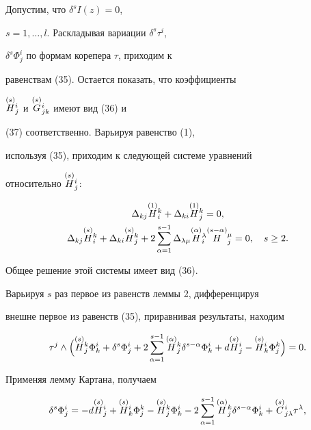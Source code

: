 \begin{pf} Допустим, что $\delta^sI(z)=0$,


$s=1,\dotsc,l$. Раскладывая вариации $\delta^s\tau^i$,


$\delta^s\Phi^i_j$ по формам корепера $\tau$, приходим к


равенствам (35). Остается показать, что коэффициенты


$\overset{(s)}{H}{}^i_j$ и $\overset{(s)}{G}{}^i_{jk}$ имеют вид (36) и


(37) соответственно. Варьируя равенство (1),


используя (35), приходим к следующей системе уравнений


относительно $\overset{(s)}{H}{}^i_j$:


\begin{gather*}


\Delta_{kj}\sv{(1)}H^k_i+\Delta_{ki}\sv{(1)}H^k_j=0,\\


\Delta_{kj}\sv{(s)}H^k_i+\Delta_{ki}\sv{(s)}H^k_j+


2\sum_{\alpha=1}^{s-1}\Delta_{\lambda\mu}


\sv{(\alpha)}H^{\lambda}_i\sv{(s-\alpha)}H^{\mu}_j=0,\quad s\ge2.


\end{gather*}


Общее решение этой системы имеет вид (36).





Варьируя $s$ раз первое из равенств леммы 2, дифференцируя


внешне первое из равенств (35), приравнивая результаты, находим


$$


\tau^j\wedge\Bigl(\sv{(s)}H^k_j\Phi^i_k+\delta^s\Phi^i_j+


2\sum_{\alpha=1}^{s-1}\sv{(\alpha)}H^k_j\delta^{s-\alpha}\Phi^i_k+


d\sv{(s)}H^i_j-\sv{(s)}H^i_k\Phi^k_j\Bigr)=0.


$$


Применяя лемму Картана, получаем


$$


\delta^s\Phi^i_j=-d\sv{(s)}H^i_j+\sv{(s)}H^i_k\Phi^k_j-\sv{(s)}H_j^k\Phi^i_k-


2\sum_{\alpha=1}^{s-1}\sv{(\alpha)}H^k_j\delta^{s-\alpha}\Phi^i_k+


\sv{(s)}C^i_{j\lambda}\tau^{\lambda},


$$



\end{pf}
